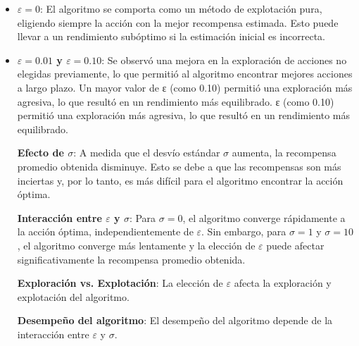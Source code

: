 \documentclass[12pt]{article}
\begin{document}
    \begin{itemize}
        \item \textbf{$\varepsilon=0$}: El algoritmo se comporta como un método de explotación pura, eligiendo siempre la acción con la mejor recompensa estimada.
        Esto puede llevar a un rendimiento subóptimo si la estimación inicial es incorrecta.
        \item \textbf{$\varepsilon=0.01$ y $\varepsilon=0.10$}: Se observó una mejora en la exploración de acciones no elegidas previamente, lo que permitió al algoritmo encontrar mejores acciones a largo plazo.
        Un mayor valor de ε (como 0.10) permitió una exploración más agresiva, lo que resultó en un rendimiento más equilibrado.
        ε (como 0.10) permitió una exploración más agresiva, lo que resultó en un rendimiento más equilibrado.


    \textbf{Efecto de $\sigma$}: A medida que el desvío estándar $\sigma$ aumenta, la recompensa promedio obtenida disminuye.
    Esto se debe a que las recompensas son más inciertas y, por lo tanto, es más difícil para el algoritmo encontrar la acción óptima.

    \textbf{Interacción entre $\varepsilon$ y $\sigma$}: Para $\sigma=0$, el algoritmo converge rápidamente a la acción óptima, independientemente de $\varepsilon$.
    Sin embargo, para $\sigma=1$ y $\sigma=10$, el algoritmo converge más lentamente y la elección de $\varepsilon$ puede afectar significativamente la recompensa promedio obtenida.

    \textbf{Exploración vs. Explotación}: La elección de $\varepsilon$ afecta la exploración y explotación del algoritmo.

    \textbf{Desempeño del algoritmo}: El desempeño del algoritmo depende de la interacción entre $\varepsilon$ y $\sigma$.

    \begin{itemize}


\end{itemize}
\end{itemize}
\end{document}
